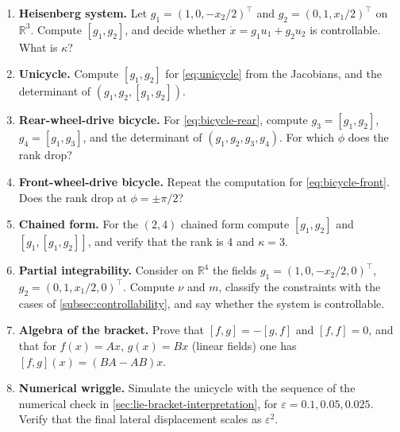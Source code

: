 \begin{enumerate}
    \item \textbf{Heisenberg system.} Let
          \( g_1 = (1, 0, -x_2/2)^\top \) and
          \( g_2 = (0, 1, x_1/2)^\top \) on \( \mathbb{R}^3 \). Compute
          \( [g_1, g_2] \), and decide whether
          \( \dot x = g_1 u_1 + g_2 u_2 \) is controllable. What is
          \( \kappa \)?
    \item \textbf{Unicycle.} Compute \( [g_1, g_2] \) for
          \cref{eq:unicycle} from the Jacobians, and the determinant of
          \( (g_1, g_2, [g_1, g_2]) \).
    \item \textbf{Rear-wheel-drive bicycle.} For \cref{eq:bicycle-rear},
          compute \( g_3 = [g_1, g_2] \), \( g_4 = [g_1, g_3] \), and
          the determinant of \( (g_1, g_2, g_3, g_4) \). For which
          \( \phi \) does the rank drop?
    \item \textbf{Front-wheel-drive bicycle.} Repeat the computation for
          \cref{eq:bicycle-front}. Does the rank drop at
          \( \phi = \pm\pi/2 \)?
    \item \textbf{Chained form.} For the \( (2,4) \) chained form
          compute \( [g_1, g_2] \) and \( [g_1,[g_1,g_2]] \), and verify
          that the rank is 4 and \( \kappa = 3 \).
    \item \textbf{Partial integrability.} Consider on \( \mathbb{R}^4 \)
          the fields \( g_1 = (1, 0, -x_2/2, 0)^\top \),
          \( g_2 = (0, 1, x_1/2, 0)^\top \). Compute \( \nu \) and
          \( m \), classify the constraints with the cases of
          \cref{subsec:controllability}, and say whether the system is
          controllable.
    \item \textbf{Algebra of the bracket.} Prove that
          \( [f, g] = -[g, f] \) and \( [f, f] = 0 \), and that for
          \( f(x) = Ax \), \( g(x) = Bx \) (linear fields) one has
          \( [f, g](x) = (BA - AB)x \).
    \item \textbf{Numerical wriggle.} Simulate the unicycle with the
          sequence of the numerical check in
          \cref{sec:lie-bracket-interpretation}, for
          \( \varepsilon = 0.1, 0.05, 0.025 \). Verify that the final
          lateral displacement scales as \( \varepsilon^2 \).
\end{enumerate}

